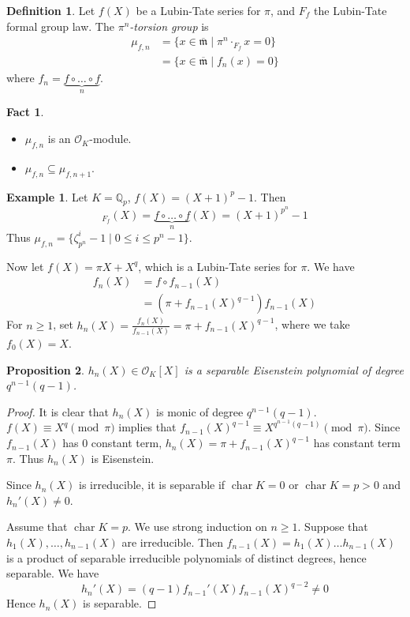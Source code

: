 \documentclass[11pt]{article}
\theoremstyle{definition}
\newtheorem{definition}{Definition}[subsection]
\newtheorem*{example}{Example}
\newtheorem*{fact}{Fact}
\theoremstyle{plain}
\newtheorem{proposition}[definition]{Proposition}
\theoremstyle{remark}
\DeclareMathOperator{\Char}{char}
\newcommand{\QQ}{\mathbb{Q}}
\newcommand{\cO}{\mathcal{O}}
\newcommand{\fm}{\mathfrak{m}}
\begin{document}
\begin{definition}
    Let $f(X)$ be a Lubin-Tate series for $\pi$, and $F_f$ the Lubin-Tate formal group law. The \emph{$\pi^n$-torsion group} is
    \begin{align*}
        \mu_{f, n}
        &= \{x \in \overline{\fm} \mid \pi^n \cdot_{F_f} x = 0\}\\
        &= \{x \in \overline{\fm} \mid f_n(x) = 0\}
    \end{align*}
    where $f_n = \underbrace{f \circ \ldots \circ f}_n$.
\end{definition}

\begin{fact}\phantom{}
    \begin{itemize}
        \item $\mu_{f,n}$ is an $\cO_K$-module.
        \item $\mu_{f,n} \subseteq \mu_{f,n+1}$.
    \end{itemize}
\end{fact}

\begin{example}
    Let $K = \QQ_p$, $f(X) = (X+1)^p - 1$. Then
    \begin{equation*}
        [p^n]_{F_f}(X) = \underbrace{f \circ \ldots \circ f}_n(X) = (X+1)^{p^n} - 1
    \end{equation*}
    Thus $\mu_{f,n} = \{\zeta_{p^n}^i - 1 \mid 0 \le i \le p^n-1\}$.
\end{example}

Now let $f(X) = \pi X + X^q$, which is a Lubin-Tate series for $\pi$. We have
\begin{align*}
    f_n(X)
    &= f \circ f_{n-1}(X)\\
    &= (\pi + f_{n-1}(X)^{q-1})f_{n-1}(X)
\end{align*}
For $n \ge 1$, set $h_n(X) = \frac{f_n(X)}{f_{n-1}(X)} = \pi + f_{n-1}(X)^{q-1}$, where we take $f_0(X) = X$.

\begin{proposition}\label{prop:20_3}
    $h_n(X) \in \cO_K[X]$ is a separable Eisenstein polynomial of degree $q^{n-1}(q-1)$.
\end{proposition}
\begin{proof}
    It is clear that $h_n(X)$ is monic of degree $q^{n-1}(q-1)$. $f(X) \equiv X^q \pmod{\pi}$ implies that $f_{n-1}(X)^{q-1} \equiv X^{q^{n-1}(q-1)} \pmod{\pi}$. Since $f_{n-1}(X)$ has $0$ constant term, $h_n(X) = \pi + f_{n-1}(X)^{q-1}$ has constant term $\pi$. Thus $h_n(X)$ is Eisenstein.

    Since $h_n(X)$ is irreducible, it is separable if $\Char K = 0$ or $\Char K = p > 0$ and $h_n'(X) \neq 0$.

    Assume that $\Char K = p$. We use strong induction on $n \ge 1$. Suppose that $h_1(X), \ldots, h_{n-1}(X)$ are irreducible. Then $f_{n-1}(X) = h_1(X) \ldots h_{n-1}(X)$ is a product of separable irreducible polynomials of distinct degrees, hence separable. We have
    \begin{equation*}
        h_n'(X) = (q-1) f_{n-1}'(X) f_{n-1}(X)^{q-2} \neq 0
    \end{equation*}
    Hence $h_n(X)$ is separable.
\end{proof}
\end{document}

